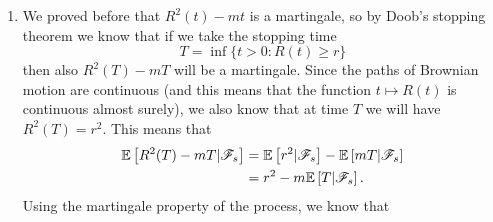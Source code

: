 \documentclass[12pt]{article}
\begin{document}
\begin{enumerate}
\begin{enumerate}
\begin{align*}
				B_i^2(t) &= [(B_i(t) - B_i(s)) + B_i(s)]^2\\ &= (B_i(t) - B_i(s))^2 + 2B_i(s)(B_i(t)-B_i(s)) + B_i(s)^2
			\end{align*}
			Taking the conditional expectations:
			\begin{align*}
				\ev[B_i^2(t)|\F_s]&=\ev\left[(B_i(t) - B_i(s))^2 + 2B_i(s)(B_i(t)-B_i(s)) + B_i(s)^2|\F_s\right]\\&=\ubracketthin{\ev[(B_i(t) - B_i(s))^2|\F_s]}_{t-s}+\ubracketthin{2B_i(s)\ev[B_i(t) - B_i(s)|\F_s]}_{0} + B_i(s)^2\\
			\end{align*}
			Since $\ev[(B_i(t) - B_i(s))^2|\F_s]$ is independent from $\F_s$ due to independence of Brownian increments, so it becomes $\ev\left[(B_i(t) - B_i(s))^2\right] = t-s$. Analogously, we have $\ev[(B_i(t) - B_i(s)|\F_s]=\ev[(B_i(t) - B_i(s)]= 0$ we get:
			\begin{align*}
				\ev[B_i^2(t)|\F_s] = B_i^2(s) + (t-s)
			\end{align*}
			So our expectation becomes:
			\begin{align*}
				\ev[R^2(t)|\F_s] &=\sum_{i=1}^m\ev\left[B_i^2|\F_s\right]-mt\\&= \sum_{i=1}^m \left[B_i^2(s) + (t-s)\right]-mt\\ 
				&=\sum_{i=1}^m \left[B_i^2(s)\right]+\cancel{mt}-ms-\cancel{mt}\\
				&= R^2(s) -ms
			\end{align*}
			which proves the martingale property.
		\end{enumerate}
		\item We proved before that $R^{2}(t)-mt$ is a martingale, so by Doob's stopping theorem we know that if we take the stopping time 
		\begin{equation*}
			T = \inf\{t > 0 : R(t) \geq r\}
		\end{equation*}
		then also $R^{2}(T) -mT$ will be a martingale. Since the paths of Brownian motion are continuous (and this means that the function $t\mapsto R(t)$ is continuous almost surely), we also know that at time $T$ we will have $R^2(T)=r^{2}$. This means that 
		\begin{align*}
			\mathbb{E}\left[R^2(T)-mT|\mathscr{F}_{s}\right]&=\mathbb{E}\left[r^{2}|\mathscr{F}_{s}\right]-\mathbb{E}\left[mT|\mathscr{F}_{s}\right]\\
			&=r^{2}-m\mathbb{E}\left[T|\mathscr{F}_{s}\right].
		\end{align*}
		Using the martingale property of the process, we know that
		\begin{equation*}

\end{equation*}
\end{enumerate}
\end{document}
